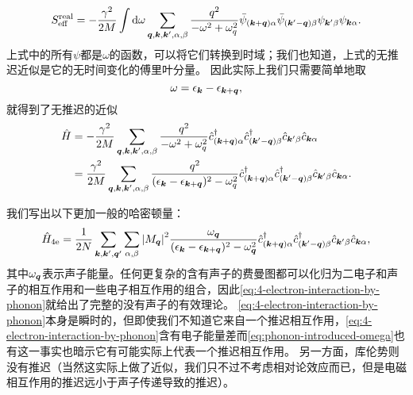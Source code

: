 \documentclass[hyperref, UTF8, a4paper]{ctexart}
\begin{document}
\[
    S_\text{eff}^\text{real} = - \frac{\gamma^2}{2 M} \int \dd{\omega} \sum_{\vb*{q}, \vb*{k}, \vb*{k}', \alpha, \beta} \frac{q^2}{- \omega^2 + \omega_q^2} \bar{\psi}_{(\vb*{k}+\vb*{q}) \alpha} \bar{\psi}_{(\vb*{k}' - \vb*{q}) \beta} \psi_{\vb*{k}' \beta} \psi_{\vb*{k} \alpha}.
\]
上式中的所有$\psi$都是$\omega$的函数，可以将它们转换到时域；我们也知道，上式的无推迟近似是它的无时间变化的傅里叶分量。
因此实际上我们只需要简单地取
\begin{equation}
    \omega = \epsilon_{\vb*{k}} - \epsilon_{\vb*{k} + \vb*{q}},
    \label{eq:phonon-introduced-omega}
\end{equation}
就得到了无推迟的近似
\begin{equation}
    \begin{aligned}
        \hat{H} &= - \frac{\gamma^2}{2 M} \sum_{\vb*{q}, \vb*{k}, \vb*{k}', \alpha, \beta} \frac{q^2}{- \omega^2 + \omega_q^2} \hat{c}^\dagger_{(\vb*{k}+\vb*{q}) \alpha} \hat{c}^\dagger_{(\vb*{k}' - \vb*{q}) \beta} \hat{c}_{\vb*{k}' \beta} \hat{c}_{\vb*{k} \alpha} \\
        &= \frac{\gamma^2}{2 M} \sum_{\vb*{q}, \vb*{k}, \vb*{k}', \alpha, \beta} \frac{q^2}{(\epsilon_{\vb*{k}} - \epsilon_{\vb*{k}+\vb*{q}})^2 - \omega_q^2} \hat{c}^\dagger_{(\vb*{k}+\vb*{q}) \alpha} \hat{c}^\dagger_{(\vb*{k}' - \vb*{q}) \beta} \hat{c}_{\vb*{k}' \beta} \hat{c}_{\vb*{k} \alpha}.
    \end{aligned}
\end{equation}

我们写出以下更加一般的哈密顿量：
\begin{equation}
    \hat{H}_{4\text{e}} = \frac{1}{2N} \sum_{\vb*{k}, \vb*{k}', \vb*{q}'} \sum_{\alpha, \beta} \abs{M_{\vb*{q}}}^2 \frac{\omega_{\vb*{q}}}{(\epsilon_{\vb*{k}} - \epsilon_{\vb*{k}+\vb*{q}})^2 - \omega_{\vb*{q}}^2} \hat{c}^\dagger_{(\vb*{k}+\vb*{q}) \alpha} \hat{c}^\dagger_{(\vb*{k}'-\vb*{q}) \beta} \hat{c}_{\vb*{k}' \beta} \hat{c}_{\vb*{k} \alpha},
    \label{eq:4-electron-interaction-by-phonon}
\end{equation}
其中$\omega_{\vb*{q}}$表示声子能量。任何更复杂的含有声子的费曼图都可以化归为二电子和声子的相互作用和一些电子相互作用的组合，因此\eqref{eq:4-electron-interaction-by-phonon}就给出了完整的没有声子的有效理论。
\eqref{eq:4-electron-interaction-by-phonon}本身是瞬时的，但即使我们不知道它来自一个推迟相互作用，\eqref{eq:4-electron-interaction-by-phonon}含有电子能量差而\eqref{eq:phonon-introduced-omega}也有这一事实也暗示它有可能实际上代表一个推迟相互作用。
另一方面，库伦势则没有推迟（当然这实际上做了近似，我们只不过不考虑相对论效应而已，但是电磁相互作用的推迟远小于声子传递导致的推迟）。
\end{document}
